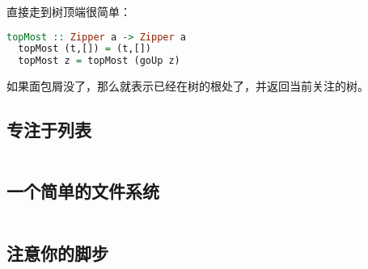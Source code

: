 \documentclass[./main.tex]{subfiles}
\begin{document}
直接走到树顶端很简单：

\begin{lstlisting}[language=Haskell]
  topMost :: Zipper a -> Zipper a
  topMost (t,[]) = (t,[])
  topMost z = topMost (goUp z)
\end{lstlisting}

如果面包屑没了，那么就表示已经在树的根处了，并返回当前关注的树。

\subsection*{专注于列表}


\begin{lstlisting}[language=Haskell]

\end{lstlisting}

\subsection*{一个简单的文件系统}


\begin{lstlisting}[language=Haskell]

\end{lstlisting}

\subsection*{注意你的脚步}


\begin{lstlisting}[language=Haskell]

\end{lstlisting}
\end{document}
